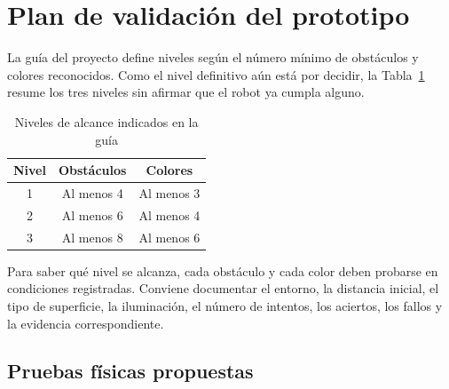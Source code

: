 \documentclass[journal]{IEEEtran}
\begin{document}

\section{Plan de validación del prototipo}

La guía del proyecto define niveles según el número mínimo de obstáculos y colores reconocidos. Como el nivel definitivo aún está por decidir, la Tabla~\ref{tab:niveles} resume los tres niveles sin afirmar que el robot ya cumpla alguno.

\begin{table}[H]
\centering
\caption{Niveles de alcance indicados en la guía}
\label{tab:niveles}
\scriptsize
\begin{tabular}{c c c}
\toprule
\textbf{Nivel} & \textbf{Obstáculos} & \textbf{Colores} \\
\midrule
1 & Al menos 4 & Al menos 3 \\
2 & Al menos 6 & Al menos 4 \\
3 & Al menos 8 & Al menos 6 \\
\bottomrule
\end{tabular}
\end{table}

Para saber qué nivel se alcanza, cada obstáculo y cada color deben probarse en condiciones registradas. Conviene documentar el entorno, la distancia inicial, el tipo de superficie, la iluminación, el número de intentos, los aciertos, los fallos y la evidencia correspondiente.

\subsection{Pruebas físicas propuestas}
\end{document}
